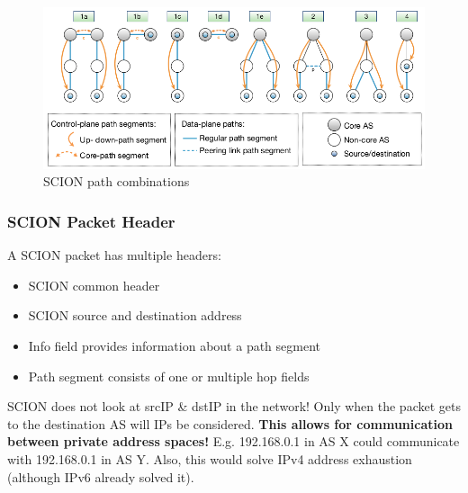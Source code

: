 \documentclass[11pt,oneside,a4paper]{article}
\begin{document}
\begin{figure}[hb]
	\centering
	\includegraphics[width=0.8\linewidth]{figures/scion_path_combinations}
	\caption{SCION path combinations}
	\label{fig:scionpathcombinations}
\end{figure}

\newpage

\subsubsection{SCION Packet Header}

A SCION packet has multiple headers:

\vspace{-\topsep}
\begin{itemize}
	\setlength{\itemsep}{0pt}
	\setlength{\parskip}{0pt}
	\item SCION common header
	\item SCION source and destination address
	\item Info field provides information about a path segment
	\item Path segment consists of one or multiple hop fields
\end{itemize}
\vspace{-\topsep}

SCION does not look at srcIP \& dstIP in the network! Only when the packet gets to the destination AS will IPs be considered. \textbf{This allows for communication between private address spaces!} E.g. 192.168.0.1 in AS X could communicate with 192.168.0.1 in AS Y. Also, this would solve IPv4 address exhaustion (although IPv6 already solved it).
\end{document}
